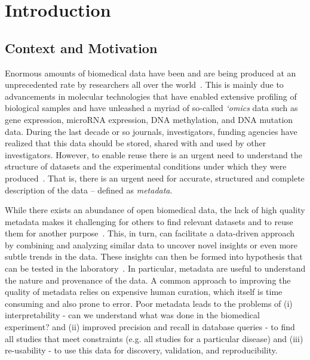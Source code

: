 \chapter{Introduction}\label{chap:intro}

\section{Context and Motivation}

Enormous amounts of biomedical data have been and are being produced at an unprecedented rate by researchers all over the world~\cite{hoffman2013use}. 
This is mainly due to advancements in molecular technologies that have enabled extensive profiling of biological samples and have unleashed a myriad of so-called \emph{`omics} data such as gene expression, microRNA expression, DNA methylation, and DNA mutation data. 
During the last decade or so journals, investigators, funding agencies have realized that this data should be stored, shared with and used by other investigators.
However, to enable reuse there is an urgent need to understand the structure of datasets and the experimental conditions under which they were produced~\cite{borgman2012conundrum}.
That is, there is an urgent need for accurate, structured and complete description of the data -- defined as \emph{metadata}.

While there exists an abundance of open biomedical data, the lack of high quality metadata makes it challenging for others to find relevant datasets and to reuse them for another purpose~\cite{gonccalves2017metadata, Hu2017}. 
This, in turn, can facilitate a data-driven approach by combining and analyzing similar data to uncover novel insights or even more subtle trends in the data.
These insights can then be formed into hypothesis that can be tested in the laboratory~\cite{barrett2012ncbi}.
In particular, metadata are useful to understand the nature and provenance of the data. A common approach to improving the quality of metadata relies on expensive human curation, which itself is time consuming and also prone to error.
Poor metadata leads to the problems of (i) interpretability - can we understand what was done in the biomedical experiment? and (ii) improved precision and recall in database queries - to find all studies that meet constraints (e.g. all studies for a particular disease) and (iii) re-usability - to use this data for discovery, validation, and reproducibility.

